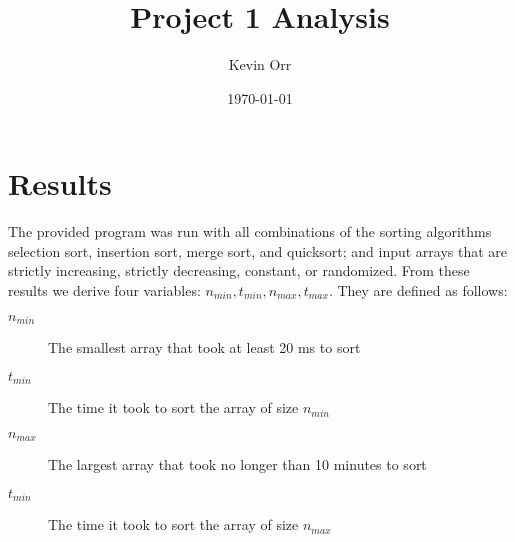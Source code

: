 \documentclass[11pt]{article}
\author{Kevin Orr}
\date{\today}
\title{Project 1 Analysis}
\begin{document}
\maketitle
\tableofcontents


\section{Results}
\label{sec:orgc1b5b42}

The provided program was run with all combinations of the sorting algorithms selection sort,
insertion sort, merge sort, and quicksort; and input arrays that are strictly increasing, strictly
decreasing, constant, or randomized. From these results we derive four variables:
\(n_{min}, t_{min}, n_{max}, t_{max}\). They are defined as follows:

\begin{description}
\item[$n_{min}$] The smallest array that took at least 20 ms to sort
\item[$t_{min}$] The time it took to sort the array of size $n_{min}$
\item[$n_{max}$] The largest array that took no longer than 10 minutes to sort
\item[$t_{min}$] The time it took to sort the array of size $n_{max}$
\end{description}
\end{document}
